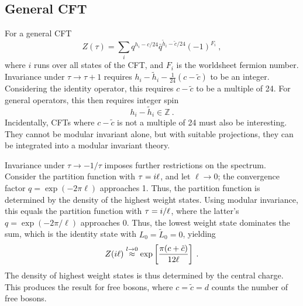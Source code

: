 \subsection*{General CFT} 
For a general CFT %
\begin{equation}
	Z(\tau)=\sum_{i} q^{h_{i}-c / 24} \bar{q}^{\tilde{h}_{i}-\tilde{c} / 24}(-1)^{F_{i}} \:, \label{7.2.28} %
\end{equation}
where $i$ runs over all states of the CFT, and $F_{i}$ is the worldsheet fermion number. Invariance under $\tau \rightarrow \tau+1$ requires $h_{i}-\tilde{h}_{i}-\frac{1}{24}(c-\tilde{c})$ to be an integer. %
Considering the identity operator, this requires $c-\tilde{c}$ to be a multiple of 24. For general operators, this then requires integer spin %
\begin{equation}
	h_{i}-\tilde{h}_{i} \in \mathds{Z} \:. \label{7.2.29} %
\end{equation}
Incidentally, CFTs where $c-\tilde{c}$ is not a multiple of 24 must also be interesting. They cannot be modular invariant alone, but with suitable projections, they can be integrated into a modular invariant theory. %

Invariance under $\tau \rightarrow-1 / \tau$ imposes further restrictions on the spectrum. 
Consider the partition function with $\tau=i \ell$, and let $\ell \rightarrow 0 $; the convergence factor $q=\exp (-2 \pi \ell)$ approaches 1. 
Thus, the partition function is determined by the density of the highest weight states. 
Using modular invariance, this equals the partition function with $\tau=i / \ell $, where the latter's $q=\exp (-2 \pi / \ell)$ approaches 0. 
Thus, the lowest weight state dominates the sum, which is the identity state with $L_{0}=\tilde{L}_{0}=0$, yielding 
\begin{equation}
	Z(i \ell) \stackrel{l \rightarrow 0}{\approx} \exp \left[\frac{\pi(c+\tilde{c})}{12 \ell}\right] \:. \label{7.2.30} 
\end{equation}
The density of highest weight states is thus determined by the central charge. This produces the result for free bosons, where $c=\tilde{c}=d$ counts the number of free bosons. 

